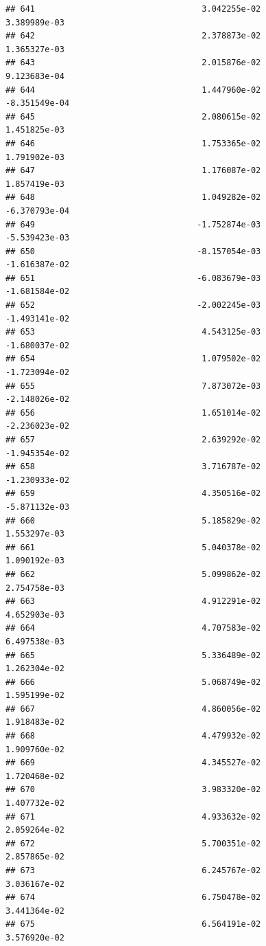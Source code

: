 \documentclass[
]{article}
\begin{document}
\begin{verbatim}
## 641                                  3.042255e-02           3.389989e-03
## 642                                  2.378873e-02           1.365327e-03
## 643                                  2.015876e-02           9.123683e-04
## 644                                  1.447960e-02          -8.351549e-04
## 645                                  2.080615e-02           1.451825e-03
## 646                                  1.753365e-02           1.791902e-03
## 647                                  1.176087e-02           1.857419e-03
## 648                                  1.049282e-02          -6.370793e-04
## 649                                 -1.752874e-03          -5.539423e-03
## 650                                 -8.157054e-03          -1.616387e-02
## 651                                 -6.083679e-03          -1.681584e-02
## 652                                 -2.002245e-03          -1.493141e-02
## 653                                  4.543125e-03          -1.680037e-02
## 654                                  1.079502e-02          -1.723094e-02
## 655                                  7.873072e-03          -2.148026e-02
## 656                                  1.651014e-02          -2.236023e-02
## 657                                  2.639292e-02          -1.945354e-02
## 658                                  3.716787e-02          -1.230933e-02
## 659                                  4.350516e-02          -5.871132e-03
## 660                                  5.185829e-02           1.553297e-03
## 661                                  5.040378e-02           1.090192e-03
## 662                                  5.099862e-02           2.754758e-03
## 663                                  4.912291e-02           4.652903e-03
## 664                                  4.707583e-02           6.497538e-03
## 665                                  5.336489e-02           1.262304e-02
## 666                                  5.068749e-02           1.595199e-02
## 667                                  4.860056e-02           1.918483e-02
## 668                                  4.479932e-02           1.909760e-02
## 669                                  4.345527e-02           1.720468e-02
## 670                                  3.983320e-02           1.407732e-02
## 671                                  4.933632e-02           2.059264e-02
## 672                                  5.700351e-02           2.857865e-02
## 673                                  6.245767e-02           3.036167e-02
## 674                                  6.750478e-02           3.441364e-02
## 675                                  6.564191e-02           3.576920e-02

\end{verbatim}
\end{document}

